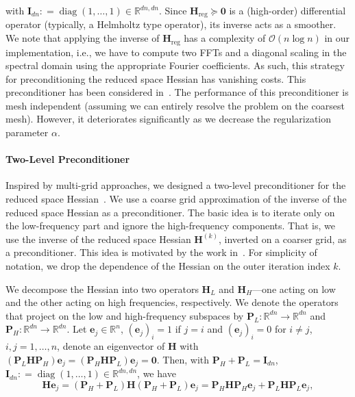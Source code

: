 \documentclass[11pt]{amsart}
\newcommand\di[1]{\ensuremath{\mathbf{#1}}}
\newcommand{\defeq}{\ensuremath{\mathrel{\mathop:}=}}
\begin{document}
\noindent with $\di{I}_{dn} \defeq \operatorname{diag}(1,\ldots,1) \in \mathbb{R}^{dn,dn}$. Since $\di{H}_{\text{reg}} \succeq \di{0}$ is a (high-order) differential operator (typically, a Helmholtz type operator), its inverse acts as a smoother. We note that applying the inverse of $\di{H}_{\text{reg}}$ has a complexity of $\mathcal{O}(n \log n)$ in our implementation, i.e., we have to compute two FFTs and a diagonal scaling in the spectral domain using the appropriate Fourier coefficients. As such, this strategy for preconditioning the reduced space Hessian has vanishing costs. This preconditioner has been considered in~\cite{Mang:2015a,Mang:2016a,Mang:2016b,Mang:2018a}. The performance of this preconditioner is mesh independent (assuming we can entirely resolve the problem on the coarsest mesh). However, it deteriorates significantly as we decrease the regularization parameter $\alpha$.




\paragraph{Two-Level Preconditioner}

Inspired by multi-grid approaches, we designed a two-level preconditioner for the reduced space Hessian~\cite{Mang:2017a,Mang:2019a}. We use a coarse grid approximation of the inverse of the reduced space Hessian as a preconditioner. The basic idea is to iterate only on the low-frequency part and ignore the high-frequency components. That is, we use the inverse of the reduced space Hessian $\di{H}^{(k)}$, inverted on a coarser grid, as a preconditioner. This idea is motivated by the work in~\cite{Adavani:2008a,Biros:2008a,Giraud:2006a,Kaltenbacher:2003a,Kaltenbacher:2001a,King:1990a}. For simplicity of notation, we drop the dependence of the Hessian on the outer iteration index $k$.

We decompose the Hessian into two operators $\di{H}_L$ and $\di{H}_H$---one acting on low and the other acting on high frequencies, respectively. We denote the operators that project on the low and high-frequency subspaces by $\di{P}_L : \mathbb{R}^{dn} \to \mathbb{R}^{dn}$ and $\di{P}_H : \mathbb{R}^{dn} \to \mathbb{R}^{dn}$. Let $\di{e}_j\in \mathbb{R}^n$, $(\di{e}_j)_i = 1$ if $j=i$ and $(\di{e}_j)_i = 0$ for $i\not=j$, $i,j=1,\ldots,n$, denote an eigenvector of $\di{H}$ with $(\di{P}_L\di{H}\di{P}_H)\di{e}_j = (\di{P}_H\di{H}\di{P}_L)\di{e}_j = \di{0}$. Then, with $\di{P}_H + \di{P}_L = \di{I}_{dn}$, $ \di{I}_{dn} \defeq \operatorname{diag}(1,\ldots,1) \in \mathbb{R}^{dn,dn}$, we have
\[
\di{H}\di{e}_j
= (\di{P}_H + \di{P}_L)\di{H}(\di{P}_H + \di{P}_L)\di{e}_j
= \di{P}_H\di{H}\di{P}_H\di{e}_j + \di{P}_L\di{H}\di{P}_L\di{e}_j,
\]
\end{document}
